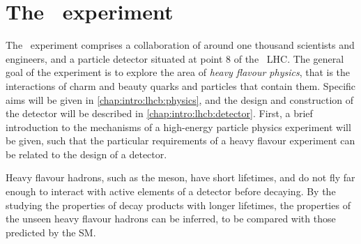 \chapter{The \lhcb\ experiment}
\label{chap:intro:lhcb}

The \lhcb\ experiment comprises a collaboration of around one thousand 
scientists and engineers, and a particle detector situated at point 8 of the 
\cern\ \ac{LHC}.
The general goal of the experiment is to explore the area of \emph{heavy 
  flavour physics}, that is the interactions of charm and beauty quarks and 
particles that contain them.
Specific aims will be given in \cref{chap:intro:lhcb:physics}, and the design 
and construction of the detector will be described in 
\cref{chap:intro:lhcb:detector}.
First, a brief introduction to the mechanisms of a high-energy particle physics 
experiment will be given, such that the particular requirements of a heavy 
flavour experiment can be related to the design of a detector.

Heavy flavour hadrons, such as the \PBs meson, have short lifetimes, and do not 
fly far enough to interact with active elements of a detector before decaying.
By the studying the properties of decay products with longer lifetimes, the 
properties of the unseen heavy flavour hadrons can be inferred, to be compared 
with those predicted by the \ac{SM}.

